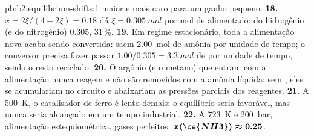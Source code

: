 \begin{solution}{pb:b2:equilibrium-shifts:1}
maior e mais caro para um ganho pequeno.
\textbf{18.} $x = 2\xi/(4 - 2\xi) = 0.18$ dá $\xi = \qty{0.305}{mol}$ por
mol de  alimentado:  do hidrogênio (e do nitrogênio)
$0.305$, 31\,\%.
\textbf{19.} Em regime estacionário, toda a alimentação nova acaba sendo convertida:
saem \qty{2.00}{mol} de amônia por unidade de tempo; o conversor precisa fazer
passar $1.00/
0.305 = \qty{3.3}{mol}$ de  por unidade de tempo, sendo o resto reciclado.
\textbf{20.} O argônio (e o metano) que entram com a alimentação nunca reagem e
não são removidos com a amônia líquida: sem , eles se acumulariam no
circuito e abaixariam as pressões parciais dos reagentes.
\textbf{21.} A \qty{500}{K}, o catalisador de ferro é lento demais: o equilíbrio
seria favorável, mas nunca seria alcançado em um tempo industrial.
\textbf{22.} A \qty{723}{K} e \qty{200}{bar}, alimentação estequiométrica, gases
perfeitos: $\boldsymbol{x(\ce{NH3}) \approx 0.25}$.
\end{solution}
